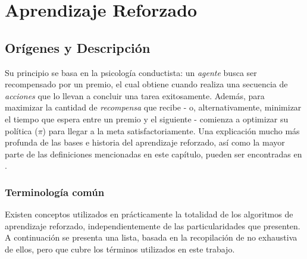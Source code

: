 \chapter{Aprendizaje Reforzado}

\section{Or\'igenes y Descripci\'on}

Su principio se basa en la psicolog\'ia conductista: un \textit{agente} busca ser recompensado por un premio, el cual obtiene cuando realiza una secuencia de \textit{acciones} que lo llevan a concluir una tarea exitosamente. Adem\'as, para maximizar la cantidad de \textit{recompensa} que recibe - o, alternativamente, minimizar el tiempo que espera entre un premio y el siguiente - comienza a optimizar su pol\'itica (\textit{$\pi$}) para llegar a la meta satisfactoriamente. Una explicaci\'on mucho m\'as profunda de las bases e historia del aprendizaje reforzado, as\'i como la mayor parte de las definiciones mencionadas en este cap\'itulo, pueden ser encontradas en \citet{Sutton}.\\

\subsection{Terminolog\'ia com\'un}

Existen conceptos utilizados en pr\'acticamente la totalidad de los algoritmos de aprendizaje reforzado, independientemente de las particularidades que presenten. A continuaci\'on se presenta una lista, basada en la recopilaci\'on de \cite{rlexplained} no exhaustiva de ellos, pero que cubre los t\'erminos utilizados en este trabajo.

